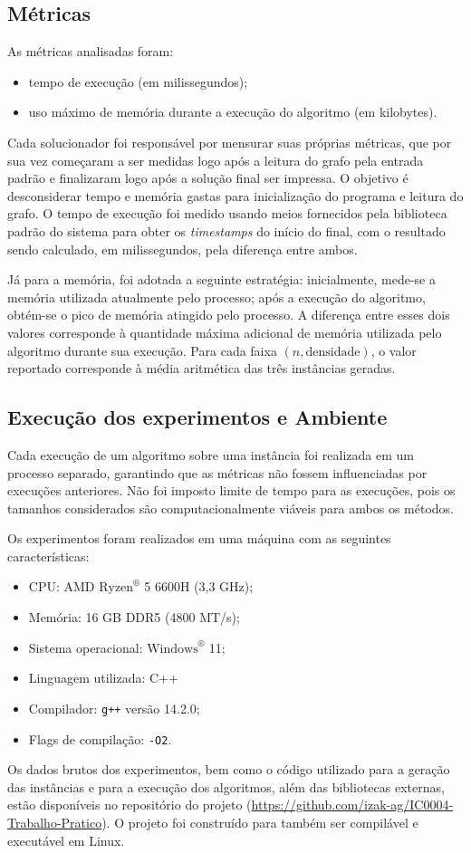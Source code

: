 \subsection{Métricas}
As métricas analisadas foram:

\begin{itemize}
    \item tempo de execução (em milissegundos);
    \item uso máximo de memória durante a execução do algoritmo (em kilobytes).
\end{itemize}

Cada solucionador foi responsável por mensurar suas próprias métricas, que por sua vez começaram a ser medidas logo após a leitura do grafo pela entrada padrão e finalizaram logo após a solução final ser impressa. O objetivo é desconsiderar tempo e memória gastas para inicialização do programa e leitura do grafo. O tempo de execução foi medido usando meios fornecidos pela biblioteca padrão do sistema para obter os \textit{timestamps} do início do final, com o resultado sendo calculado, em milissegundos, pela diferença entre ambos.

Já para a memória, foi adotada a seguinte estratégia: inicialmente, mede-se a memória utilizada atualmente pelo processo; após a execução do algoritmo, obtém-se o pico de memória atingido pelo processo. A diferença entre esses dois valores corresponde à quantidade máxima adicional de memória utilizada pelo algoritmo durante sua execução. Para cada faixa $(n,\text{densidade})$, o valor reportado corresponde à média aritmética das três instâncias geradas.

\subsection{Execução dos experimentos e Ambiente}
Cada execução de um algoritmo sobre uma instância foi realizada em um processo separado, garantindo que as métricas não fossem influenciadas por execuções anteriores. Não foi imposto limite de tempo para as execuções, pois os tamanhos considerados são computacionalmente viáveis para ambos os métodos.

Os experimentos foram realizados em uma máquina com as seguintes características:
\begin{itemize}
    \item CPU: AMD $\text{Ryzen}^{\circledR}$ 5 6600H (3,3 GHz);
    \item Memória: 16 GB DDR5 (4800 MT/s);
    \item Sistema operacional: $\text{Windows}^{\circledR}$ 11;
    \item Linguagem utilizada: C++
    \item Compilador: \texttt{g++} versão 14.2.0;
    \item Flags de compilação: \texttt{-O2}.
\end{itemize}
Os dados brutos dos experimentos, bem como o código utilizado para a geração das instâncias e para a execução dos algoritmos, além das bibliotecas externas, estão disponíveis no repositório do projeto (\href{https://github.com/izak-ag/IC0004-Trabalho-Pratico}{https://github.com/izak-ag/IC0004-Trabalho-Pratico}). O projeto foi construído para também ser compilável e executável em Linux.
